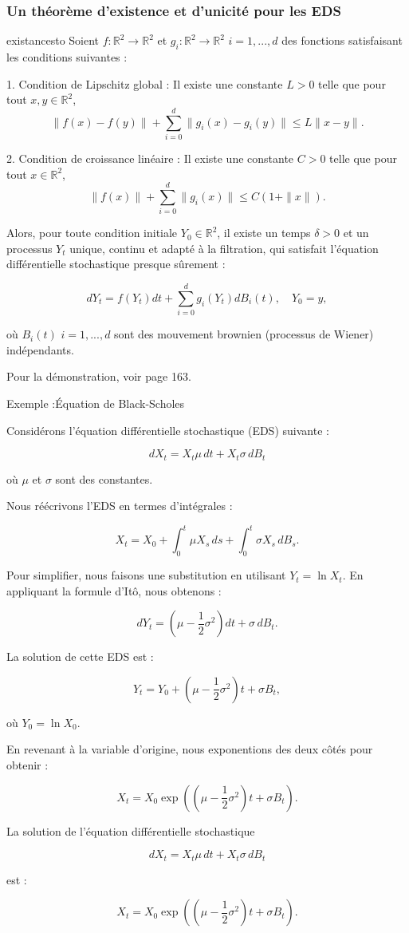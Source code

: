 \documentclass[12pt,a4paper]{report}%
\newcounter{PP}[chapter]
\newenvironment{exemple}[2][]
  {\refstepcounter{PP}
  \begin{bclogo}[
    logo=\bccrayon , %
    couleur=white,
    arrondi=0.1,
    barre =snake,
     tailleOndu = 1.5,
    couleurBord=white,#1]{Exemple \thePP:#2}
  }
  {\end{bclogo}}
\begin{document}
\subsubsection{Un théorème d'existence et d'unicité pour les EDS}
\begin{théorème}{}{existancesto}
Soient \(f : \mathbb{R}^2 \to \mathbb{R}^2\) et \(g_i : \mathbb{R}^2 \to \mathbb{R}^2\) $i=1,...,d$ des fonctions satisfaisant les conditions suivantes :

1. Condition de Lipschitz global : Il existe une constante \(L > 0\) telle que pour tout \(x, y \in \mathbb{R}^2\),
   \[
   \|f(x) - f(y)\| +\sum\limits_{i=0}^{d} \|g_i(x) - g_i(y)\| \leqslant L \|x - y\|.
   \]

2. Condition de croissance linéaire : Il existe une constante \(C > 0\) telle que pour tout \(x \in \mathbb{R}^2\),
   \[
   \|f(x)\| + \sum\limits_{i=0}^{d}\|g_i(x)\| \leqslant C(1 + \|x\|).
   \]

Alors, pour toute condition initiale \(Y_0 \in \mathbb{R}^2\), il existe un temps \(\delta > 0\) et un processus \(Y_t\) unique, continu et adapté à la filtration, qui satisfait l'équation différentielle stochastique presque sûrement :

\[
dY_t = f(Y_t)dt +\sum\limits_{i=0}^{d} g_i(Y_t)dB_i(t), \quad Y_0 = y,
\]

où \(B_i(t)\) $i=1,...,d$ sont des mouvement brownien (processus de Wiener) indépendants.
\end{théorème}
Pour la démonstration, voir \cite{F} page 163.\\
\begin{exemple}{Équation de Black-Scholes}
Considérons l'équation différentielle stochastique (EDS) suivante :

\[ dX_t = X_t \mu \, dt + X_t \sigma \, dB_t \]

où \( \mu \) et \( \sigma \) sont des constantes.

Nous réécrivons l'EDS en termes d'intégrales :

\[ X_t = X_0 + \int_0^t \mu X_s \, ds + \int_0^t \sigma X_s \, dB_s. \]

Pour simplifier, nous faisons une substitution en utilisant \( Y_t = \ln X_t \). En appliquant la formule d'Itô, nous obtenons :

\[ dY_t = \left( \mu - \frac{1}{2} \sigma^2 \right) dt + \sigma \, dB_t. \]

La solution de cette EDS est :

\[ Y_t = Y_0 + \left( \mu - \frac{1}{2} \sigma^2 \right) t + \sigma B_t, \]

où \( Y_0 = \ln X_0 \).

En revenant à la variable d'origine, nous exponentions des deux côtés pour obtenir :

\[ X_t = X_0 \exp \left( \left( \mu - \frac{1}{2} \sigma^2 \right) t + \sigma B_t \right). \]

La solution de l'équation différentielle stochastique

\[ dX_t = X_t \mu \, dt + X_t \sigma \, dB_t \]

est :

\[ X_t = X_0 \exp \left( \left( \mu - \frac{1}{2} \sigma^2 \right) t + \sigma B_t \right). \]
\end{exemple}
\end{document}

